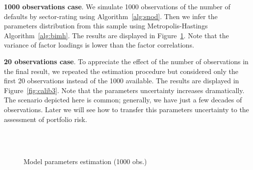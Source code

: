 \documentclass[11pt,fleqn]{book} %
\begin{document}
\begin{example}
	\textbf{1000 observations case}. We simulate \num{1000} observations 
	of the number of defaults by sector-rating using Algorithm~\ref{alg:snod}. 
	Then we infer the parameters distribution from this sample using 
	Metropolis-Hastings Algorithm~\ref{alg:bimh}. The results are displayed in 
	Figure~\ref{fig:calib1}. Note that the variance of factor loadings is 
	lower than the factor correlations.

	\textbf{20 observations case}. To appreciate the effect of the number of 
	observations in the final result, we repeated the estimation procedure 
	but considered only the first 20 observations instead of the \num{1000}
	available. The results are displayed in Figure~\ref{fig:calib3}. Note 
	that the parameters uncertainty increases dramatically. The scenario 
	depicted here is common; generally, we have just a few decades of 
	observations. Later we will see how to transfer this parameters 
	uncertainty to the assessment of portfolio risk.
\end{example}

\begin{figure}[!ht]
	\centering
	\hfill
	\\
	\\
	\caption{Model parameters estimation (1000 obs.)}
	\label{fig:calib1}
\end{figure}
\end{document}
